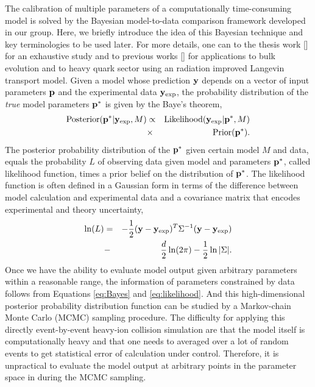 \documentclass[aps, prc, reprint, amsmath, groupedaddress, nofootinbib]{revtex4-1}
\begin{document}
The calibration of multiple parameters of a computationally time-consuming model is solved by the Bayesian model-to-data comparison framework developed in our group.
Here, we briefly introduce the idea of this Bayesian technique and key terminologies to be used later.
For more details, one can to the thesis work [] for an exhaustive study and to previous works [] for applications to bulk evolution and to heavy quark sector using an radiation improved Langevin transport model.
Given a model whose prediction ${\bf y}$ depends on a vector of input parameters ${\bf p}$ and the experimental data ${\bf y}_\textrm{exp}$, 
the probability distribution of the {\it true} model parameters ${\bf p^*}$ is given by the Baye's theorem, 
\begin{eqnarray}\label{eq:Bayes}
\textrm{Posterior}({\bf p^*}|{\bf y}_\textrm{exp}, M) &\propto& \textrm{Likelihood}({\bf y}_\textrm{exp}|{\bf p^*}, M) \nonumber \\ &\times& \textrm{Prior}({\bf p^*}).
\end{eqnarray}
The posterior probability distribution of the ${\bf p^*}$ given certain model $M$ and data, equals the probability $L$ of observing data given model and parameters ${\bf p^*}$, called likelihood function, times a prior belief on the distribution of ${\bf p^*}$.
The likelihood function is often defined in a Gaussian form in terms of the difference between model calculation and experimental data and a covariance matrix that encodes experimental and theory uncertainty,
\begin{eqnarray}\label{eq:likelihood}
\ln(L) &=& -\frac{1}{2}({\bf y}-{\bf y}_{\textrm{exp}})^T\Sigma^{-1} ({\bf y}-{\bf y}_{\textrm{exp}})\nonumber\\ 
		&-&\frac{d}{2}\ln(2\pi)-\frac{1}{2}\ln|\Sigma|.
\end{eqnarray}
Once we have the ability to evaluate model output given arbitrary parameters within a reasonable range, the information of parameters constrained by data follows from Equations \ref{eq:Bayes} and \ref{eq:likelihood}.
And this high-dimensional posterior probability distribution function can be studied by a Markov-chain Monte Carlo (MCMC) sampling procedure.
The difficulty for applying this directly event-by-event heavy-ion collision simulation are that the model itself is computationally heavy and that one needs to averaged over a lot of random events to get statistical error of calculation under control.
Therefore, it is unpractical to evaluate the model output at arbitrary points in the parameter space in during the MCMC sampling.
\end{document}

